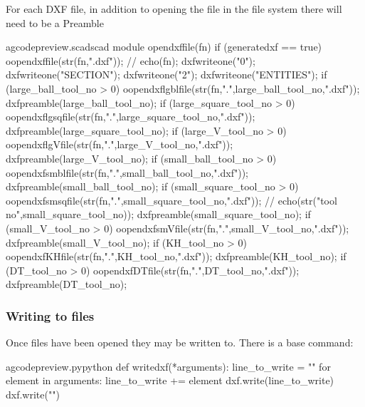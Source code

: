 \documentclass{ltxdoc}
\begin{document}
For each DXF file, in addition to opening the file in the file system there will need to be 
a Preamble

\lstset{firstnumber=\thegcpscad}
\begin{writecode}{a}{gcodepreview.scad}{scad}
module opendxffile(fn) {
  if (generatedxf == true) {
      oopendxffile(str(fn,".dxf"));
//    echo(fn);
      dxfwriteone("0");
      dxfwriteone("SECTION");
      dxfwriteone("2");
      dxfwriteone("ENTITIES");
    if (large_ball_tool_no >  0) {    oopendxflgblfile(str(fn,".",large_ball_tool_no,".dxf"));
      dxfpreamble(large_ball_tool_no);
    } 
    if (large_square_tool_no >  0) {    oopendxflgsqfile(str(fn,".",large_square_tool_no,".dxf"));
      dxfpreamble(large_square_tool_no);
    } 
    if (large_V_tool_no >  0) {    oopendxflgVfile(str(fn,".",large_V_tool_no,".dxf"));
      dxfpreamble(large_V_tool_no);
    } 
    if (small_ball_tool_no >  0) { oopendxfsmblfile(str(fn,".",small_ball_tool_no,".dxf"));
      dxfpreamble(small_ball_tool_no);
    } 
    if (small_square_tool_no >  0) {    oopendxfsmsqfile(str(fn,".",small_square_tool_no,".dxf"));
//    echo(str("tool no",small_square_tool_no));
      dxfpreamble(small_square_tool_no);
    } 
    if (small_V_tool_no >  0) {    oopendxfsmVfile(str(fn,".",small_V_tool_no,".dxf"));
      dxfpreamble(small_V_tool_no);
    } 
    if (KH_tool_no >  0) {    oopendxfKHfile(str(fn,".",KH_tool_no,".dxf"));
      dxfpreamble(KH_tool_no);
    } 
    if (DT_tool_no >  0) {    oopendxfDTfile(str(fn,".",DT_tool_no,".dxf"));
      dxfpreamble(DT_tool_no);
    } 
  }
}

\end{writecode}
\addtocounter{gcpscad}{36}

\subsubsection{Writing to files}
 
Once files have been opened they may be written to. There is a base command:
 
\lstset{firstnumber=\thegcpy}
\begin{writecode}{a}{gcodepreview.py}{python}
def writedxf(*arguments):
    line_to_write = ""
    for element in arguments:
       line_to_write += element
    dxf.write(line_to_write)
    dxf.write("\n")

\end{writecode}
\addtocounter{gcpy}{7}
\end{document}
